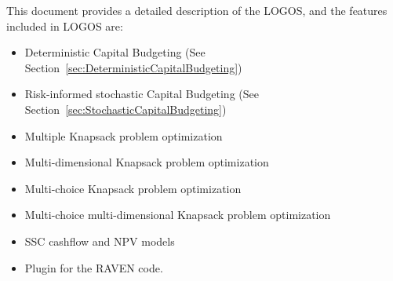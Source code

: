 This document provides a detailed description of the LOGOS, and the features included in LOGOS are:
\begin{itemize}
	\item Deterministic Capital Budgeting (See Section~\ref{sec:DeterministicCapitalBudgeting})
	\item Risk-informed stochastic Capital Budgeting (See Section~\ref{sec:StochasticCapitalBudgeting})
	\item Multiple Knapsack problem optimization
	\item Multi-dimensional Knapsack problem optimization
	\item Multi-choice Knapsack problem optimization
	\item Multi-choice multi-dimensional Knapsack problem optimization
	\item SSC cashflow and NPV models
	\item Plugin for the RAVEN code.
\end{itemize}
